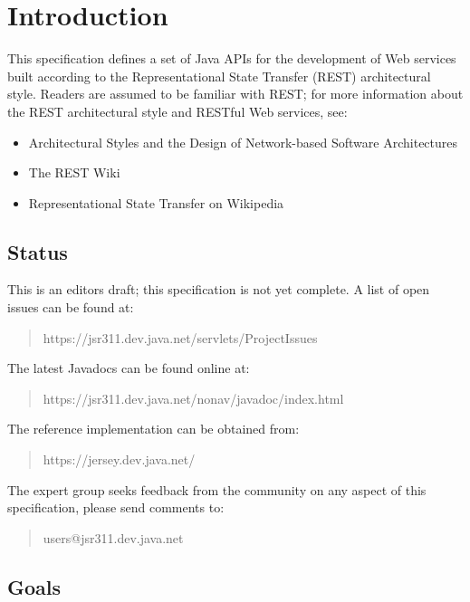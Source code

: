 \chapter{Introduction}

This specification defines a set of Java APIs for the development of Web services built according to the Representational State Transfer\cite{rest} (REST) architectural style. Readers are assumed to be familiar with 
REST; for more information about the REST architectural style and RESTful Web services, see:

\begin{itemize}
\item Architectural Styles and the Design of Network-based Software Architectures\cite{rest}
\item The REST Wiki\cite{restwiki}
\item Representational State Transfer on Wikipedia\cite{restwikipedia}
\end{itemize}

\section{Status}

This is an editors draft; this specification is not yet complete. A list of open issues can be found at:

\begin{quote}
https://jsr311.dev.java.net/servlets/ProjectIssues
\end{quote}

The latest Javadocs can be found online at:

\begin{quote}
https://jsr311.dev.java.net/nonav/javadoc/index.html
\end{quote}

The reference implementation can be obtained from:

\begin{quote}
https://jersey.dev.java.net/
\end{quote}

The expert group seeks feedback from the community on any aspect of this specification, please send comments to:

\begin{quote}
users@jsr311.dev.java.net
\end{quote}

\section{Goals}

